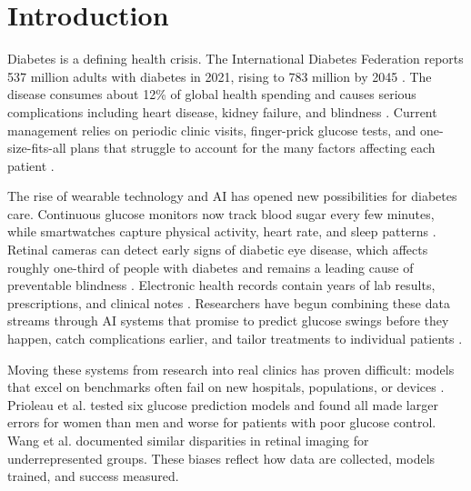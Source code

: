 \section{Introduction}

Diabetes is a defining health crisis. The International Diabetes Federation reports 537 million adults with diabetes in 2021, rising to 783 million by 2045 \cite{sun2022idf, idf2021atlas}. The disease consumes about 12\% of global health spending and causes serious complications including heart disease, kidney failure, and blindness \cite{idf2021atlas, guan2023artificial}. Current management relies on periodic clinic visits, finger-prick glucose tests, and one-size-fits-all plans that struggle to account for the many factors affecting each patient \cite{oikonomou2023machine, mackenzie2023diabetes}.

The rise of wearable technology and AI has opened new possibilities for diabetes care. Continuous glucose monitors now track blood sugar every few minutes, while smartwatches capture physical activity, heart rate, and sleep patterns \cite{alhaddad2022sense, rodriguez2023applications}. Retinal cameras can detect early signs of diabetic eye disease, which affects roughly one-third of people with diabetes and remains a leading cause of preventable blindness \cite{yau2012global, zhang2025systematic}. Electronic health records contain years of lab results, prescriptions, and clinical notes \cite{oikonomou2023machine}. Researchers have begun combining these data streams through AI systems that promise to predict glucose swings before they happen, catch complications earlier, and tailor treatments to individual patients \cite{mackenzie2023diabetes, khalifa2024artificial, lee2024multimodal}.

Moving these systems from research into real clinics has proven difficult: models that excel on benchmarks often fail on new hospitals, populations, or devices \cite{prioleau2025deep, zhu2021deep, alam2024machine}. Prioleau et al. \cite{prioleau2025deep} tested six glucose prediction models and found all made larger errors for women than men and worse for patients with poor glucose control. Wang et al. \cite{wang2024ai} documented similar disparities in retinal imaging for underrepresented groups. These biases reflect how data are collected, models trained, and success measured.

